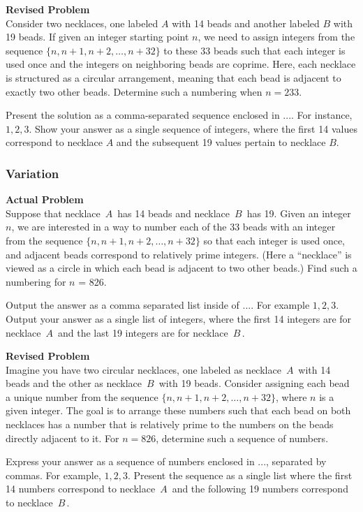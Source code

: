 \textbf{Revised Problem}\\
Consider two necklaces, one labeled \( A \) with 14 beads and another labeled \( B \) with 19 beads. If given an integer starting point \( n \), we need to assign integers from the sequence \(\{ n, n+1, n+2, \ldots, n+32 \}\) to these 33 beads such that each integer is used once and the integers on neighboring beads are coprime. Here, each necklace is structured as a circular arrangement, meaning that each bead is adjacent to exactly two other beads. Determine such a numbering when \( n = 233 \).

Present the solution as a comma-separated sequence enclosed in \(\boxed{...}\). For instance, \(\boxed{1, 2, 3}\). Show your answer as a single sequence of integers, where the first 14 values correspond to necklace \( A \) and the subsequent 19 values pertain to necklace \( B \).

\subsubsection{Variation}
\textbf{Actual Problem}\\
Suppose that necklace $\, A \,$ has 14 beads and necklace $\, B \,$ has 19. 
Given an integer $n$, we are interested in a way to number each of the 33 beads with an integer from the sequence $\{ n, n+1, n+2, \dots, n+32 \}$ so that each integer is used once, and adjacent beads correspond to relatively prime integers. (Here a ``necklace'' is viewed as a circle in which each bead is adjacent to two other beads.) Find such a numbering for $n$ = 826.

Output the answer as a comma separated list inside of $\boxed{...}$. For example $\boxed{1, 2, 3}$.
Output your answer as a single list of integers, where the first 14 integers are for necklace $\, A \,$ and the last 19 integers are for necklace $\, B \,$.

\textbf{Revised Problem}\\
Imagine you have two circular necklaces, one labeled as necklace $\, A \,$ with 14 beads and the other as necklace $\, B \,$ with 19 beads. Consider assigning each bead a unique number from the sequence $\{ n, n+1, n+2, \dots, n+32 \}$, where $n$ is a given integer. The goal is to arrange these numbers such that each bead on both necklaces has a number that is relatively prime to the numbers on the beads directly adjacent to it. For $n = 826$, determine such a sequence of numbers.

Express your answer as a sequence of numbers enclosed in $\boxed{...}$, separated by commas. For example, $\boxed{1, 2, 3}$. Present the sequence as a single list where the first 14 numbers correspond to necklace $\, A \,$ and the following 19 numbers correspond to necklace $\, B \,$.

